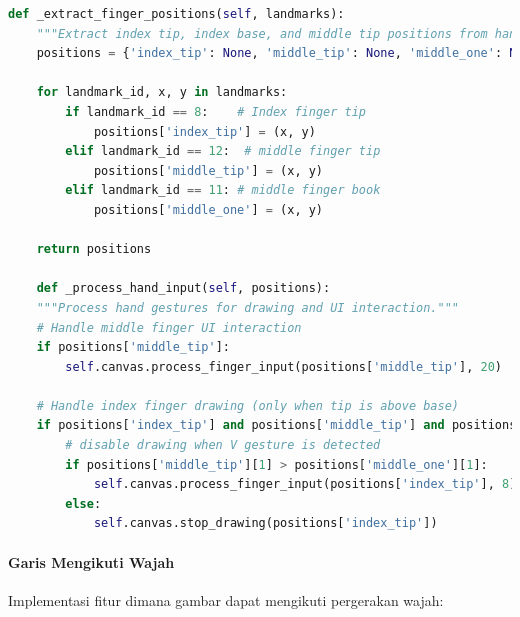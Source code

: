 \documentclass[11pt,a4paper]{article}
\begin{document}
\begin{lstlisting}[language=Python, caption=Ekstraksi posisi jari dan gesture recognition]
    def _extract_finger_positions(self, landmarks):
    """Extract index tip, index base, and middle tip positions from hand landmarks."""
    positions = {'index_tip': None, 'middle_tip': None, 'middle_one': None}
    
    for landmark_id, x, y in landmarks:
        if landmark_id == 8:    # Index finger tip
            positions['index_tip'] = (x, y)
        elif landmark_id == 12:  # middle finger tip
            positions['middle_tip'] = (x, y)
        elif landmark_id == 11: # middle finger book
            positions['middle_one'] = (x, y)
    
    return positions

    def _process_hand_input(self, positions):
    """Process hand gestures for drawing and UI interaction."""
    # Handle middle finger UI interaction
    if positions['middle_tip']:
        self.canvas.process_finger_input(positions['middle_tip'], 20)
    
    # Handle index finger drawing (only when tip is above base)
    if positions['index_tip'] and positions['middle_tip'] and positions['middle_one']:
        # disable drawing when V gesture is detected
        if positions['middle_tip'][1] > positions['middle_one'][1]:
            self.canvas.process_finger_input(positions['index_tip'], 8)
        else:
            self.canvas.stop_drawing(positions['index_tip'])
\end{lstlisting}

\paragraph{Garis Mengikuti Wajah}
Implementasi fitur dimana gambar dapat mengikuti pergerakan wajah:
\end{document}
